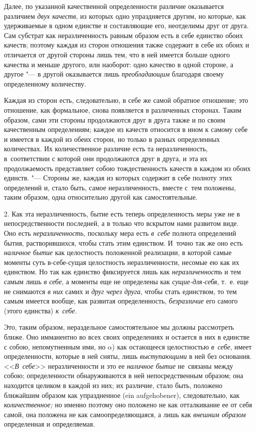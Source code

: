 Далее, по указанной качественной определенности различие оказывается различием
{\em двух качеств}, из которых одно упраздняется другим, но которые, как
удерживаемые в одном единстве и составляющие его, неотделимы друг от друга. Сам
субстрат как неразличенность равным образом есть в себе единство обоих качеств;
поэтому каждая из сторон отношения также содержит в себе их обоих и отличается
от другой стороны лишь тем, что в ней имеется больше одного качества и меньше
другого, или наоборот: одно качество в одной стороне, а другое "--- в другой
оказывается лишь {\em преобладающим} благодаря своему определенному количеству.

Каждая из сторон есть, следовательно, в себе же самой обратное отношение; это
отношение, как формальное, снова появляется в различенных сторонах. Таким
образом, сами эти стороны продолжаются друг в друга также и по своим
качественным определениям; каждое из качеств относится в ином к самому себе и
имеется в каждой из обеих сторон, но только в разных определенных количествах.
Их количественное различие есть та неразличенность, в~соответствии с которой
они продолжаются друг в друга, и эта их продолжаемость представляет собою
тождественность качеств в каждом из обоих единств. "--- Стороны же, каждая из
которых содержит в себе полноту этих определений и, стало быть, самое
неразличенность, вместе с~тем положены, таким образом, одна относительно
другой как самостоятельные.

2. Как эта неразличенность, бытие есть теперь определенность меры уже не в
непосредственности последней, а в только что вскрытом нами развитом виде. Оно
есть {\em неразличенность}, поскольку мера есть {\em в~себе} полнота
определений бытия, растворившихся, чтобы стать этим единством. И~точно так же
оно есть {\em наличное бытие} как целостность положенной реализации, в которой
самые моменты суть в-себе-сущая целостность неразличенности, несомые ею как их
единством. Но так как единство фиксируется лишь как {\em неразличенность} и тем
самым лишь {\em в себе}, а моменты еще не определены как {\em сущие-для-себя},
т.~е. еще не снимаются {\em в них} самих и {\em друг через друга}, чтобы стать
единством, то тем самым имеется вообще, как развитая определенность, {\em
безразличие} его самого (этого единства) {\em к~себе}.

Это, таким образом, нераздельное самостоятельное мы должны рассмотреть ближе.
Оно имманентно во всех своих определениях и остается в них в единстве с собою,
непомутненным ими, но $\alpha$) как остающееся целостностью {\em в~себе}, имеет
определенности, которые в ней сняты, лишь {\em выступающими} в ней без
основания. <<{\em В~себе}>> неразличенности и это ее {\em наличное бытие}
не~связаны между собою; определенности обнаруживаются в ней непосредственным
образом; она находится целиком в каждой из них; их различие, стало быть,
положено ближайшим образом как упраздненное (ein aufgehobener), следовательно,
как {\em количественное;} но именно поэтому оно положено не как отталкивание ее
от себя самой, она положена не как самоопределяющаяся, а лишь как {\em внешним
образом} определенная и определяемая.

